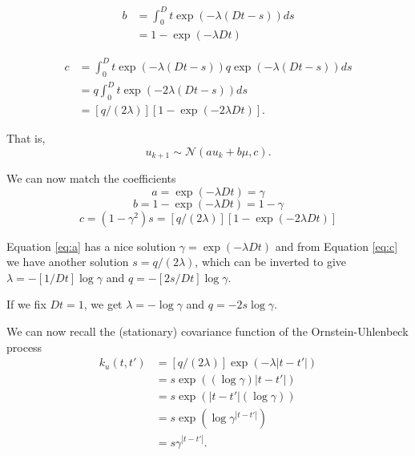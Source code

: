 \begin{equation*} \label{eq:b}
\begin{split}
b &= \int_0^Dt \exp(-\lambda (Dt-s)) ds\\
&= 1 - \exp(-\lambda Dt)
\end{split}
\end{equation*}

\begin{equation*} \label{eq:c}
\begin{split} 
c &= \int_0^Dt \exp(-\lambda (Dt-s)) q \exp(-\lambda (Dt-s)) ds \\
&= q \int_0^Dt \exp(-2 \lambda (Dt-s)) ds\\
&= [q / (2 \lambda)] [1 - \exp(-2 \lambda Dt)].
\end{split}
\end{equation*}

That is,
\begin{equation}
u_{k+1} \sim \mathcal{N}\left(a u_k + b \mu, c\right).
\end{equation}

We can now match the coefficients
\begin{equation} \label{eq:a}
a = \exp(-\lambda Dt) = \gamma
\end{equation}
\begin{equation} \label{eq:b}
b = 1 - \exp(-\lambda Dt) = 1 - \gamma
\end{equation}
\begin{equation} \label{eq:c}
c = (1 - \gamma^2) s = [q / (2 \lambda)] [1 - \exp(-2 \lambda Dt)]
\end{equation}

Equation \ref{eq:a} has a nice solution $\gamma = \exp(-\lambda Dt)$ and from Equation \ref{eq:c} we have another solution
$s = q / (2 \lambda)$,
which can be inverted to give
$\lambda = -[1 / Dt] \log \gamma$ and
$q = -[2 s / Dt] \log \gamma$. 

If we fix $Dt = 1$, we get
$\lambda = -\log \gamma$ and $q = -2 s \log \gamma$.

We can now recall the (stationary) covariance function of the Ornstein-Uhlenbeck process 
\begin{equation*} \label{eq:ku}
\begin{split}
k_u(t,t') &= [q / (2 \lambda)] \exp(-\lambda {\left|t-t'\right|})\\
&= s \exp((\log \gamma) {\left|t-t'\right|})\\
&= s \exp({\left|t-t'\right|}(\log \gamma))\\
&= s \exp(\log \gamma^{\left|t-t'\right|})\\
&= s \gamma^{\left|t-t'\right|}.
\end{split}
\end{equation*}

